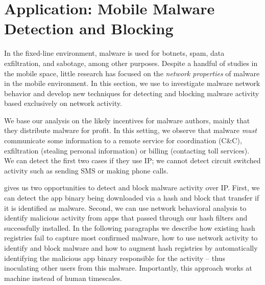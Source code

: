 \section{Application: Mobile Malware \\
Detection and Blocking}
\label{sec:malware}

%
%
%


In the fixed-line environment, malware is used for botnets, spam, data exfiltration, and sabotage, among other 
purposes. Despite a handful of studies in the mobile space, little research has focused on the \emph{network 
properties} of malware in the mobile environment. In this section, we use \meddle to investigate malware network 
behavior and develop new techniques for detecting and blocking malware activity based exclusively on network 
activity.

 We base our analysis on the likely incentives for malware authors, mainly 
that they distribute malware for profit. In this setting, we observe that malware \emph{must} communicate some information 
to a remote service for coordination (\eg C\&C), exfiltration (stealing personal information) or billing (contacting toll services). 
We can detect the first two cases if they use IP; we cannot detect circuit switched activity such as sending SMS or making 
phone calls.

\meddle gives us two opportunities to detect and block malware activity over IP. First, we can detect 
the app binary being downloaded via a hash and block that transfer if it is identified as malware. Second, we can use network 
behavioral analysis to identify malicious activity from apps that passed through our hash filters and successfully installed. 
In the following paragraphs we describe how existing hash registries fail to capture most confirmed malware, how to 
use network activity to identify and block malware and how to augment hash registries by automatically identifying the 
malicious app binary responsible for the activity -- thus inoculating other users from this malware. Importantly, 
this approach works at machine instead of human timescales.%


